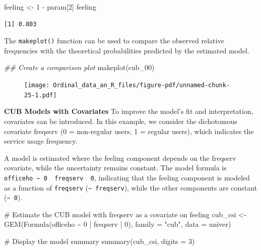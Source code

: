 \documentclass[
  letterpaper,
  DIV=11,
  numbers=noendperiod]{scrartcl}
\newenvironment{Shaded}{\begin{snugshade}}{\end{snugshade}}
\newcommand{\AttributeTok}[1]{\textcolor[rgb]{0.40,0.45,0.13}{#1}}
\newcommand{\CommentTok}[1]{\textcolor[rgb]{0.37,0.37,0.37}{#1}}
\newcommand{\DecValTok}[1]{\textcolor[rgb]{0.68,0.00,0.00}{#1}}
\newcommand{\DocumentationTok}[1]{\textcolor[rgb]{0.37,0.37,0.37}{\textit{#1}}}
\newcommand{\FunctionTok}[1]{\textcolor[rgb]{0.28,0.35,0.67}{#1}}
\newcommand{\NormalTok}[1]{\textcolor[rgb]{0.00,0.23,0.31}{#1}}
\newcommand{\OtherTok}[1]{\textcolor[rgb]{0.00,0.23,0.31}{#1}}
\newcommand{\SpecialCharTok}[1]{\textcolor[rgb]{0.37,0.37,0.37}{#1}}
\newcommand{\StringTok}[1]{\textcolor[rgb]{0.13,0.47,0.30}{#1}}
\begin{document}
\begin{Shaded}
\begin{Highlighting}[]
\NormalTok{feeling }\OtherTok{\textless{}{-}} \DecValTok{1} \SpecialCharTok{{-}}\NormalTok{ param[}\DecValTok{2}\NormalTok{]}
\NormalTok{feeling}
\end{Highlighting}
\end{Shaded}

\begin{verbatim}
[1] 0.803
\end{verbatim}

The \texttt{makeplot()} function can be used to compare the observed
relative frequencies with the theoretical probabilities predicted by the
estimated model.

\begin{Shaded}
\begin{Highlighting}[]
\DocumentationTok{\#\# Create a comparison plot}
\FunctionTok{makeplot}\NormalTok{(cub\_00)}
\end{Highlighting}
\end{Shaded}

\begin{figure}[H]

{\centering \texttt{[image: Ordinal\_data\_an\_R\_files/figure-pdf/unnamed-chunk-25-1.pdf]}

}

\end{figure}

\textbf{CUB Models with Covariates} To improve the model's fit and
interpretation, covariates can be introduced. In this example, we
consider the dichotomous covariate freqserv (0 = non-regular users, 1 =
regular users), which indicates the service usage frequency.

A model is estimated where the feeling component depends on the freqserv
covariate, while the uncertainty remains constant. The model formula is
\texttt{officeho\ \textasciitilde{}\ 0\ \textbar{}\ freqserv\ \textbar{}\ 0},
indicating that the feeling component is modeled as a function of
\texttt{freqserv} (\texttt{\textasciitilde{}\ freqserv}), while the
other components are constant (\texttt{\textasciitilde{}\ 0}).

\begin{Shaded}
\begin{Highlighting}[]
\CommentTok{\# Estimate the CUB model with freqserv as a covariate on feeling}
\NormalTok{cub\_csi }\OtherTok{\textless{}{-}} \FunctionTok{GEM}\NormalTok{(}\FunctionTok{Formula}\NormalTok{(officeho }\SpecialCharTok{\textasciitilde{}} \DecValTok{0} \SpecialCharTok{|}\NormalTok{ freqserv }\SpecialCharTok{|} \DecValTok{0}\NormalTok{), }\AttributeTok{family =} \StringTok{"cub"}\NormalTok{, }\AttributeTok{data =}\NormalTok{ univer)}

\CommentTok{\# Display the model summary}
\FunctionTok{summary}\NormalTok{(cub\_csi, }\AttributeTok{digits =} \DecValTok{3}\NormalTok{)}
\end{Highlighting}
\end{Shaded}
\end{document}
